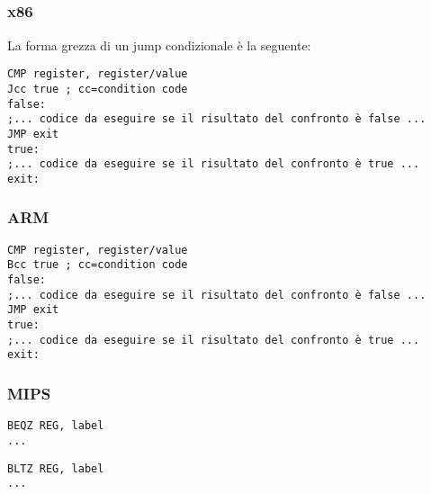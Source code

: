 \label{sec:Jcc}






\subsection{\Conclusion{}}

\subsubsection{x86}

La forma grezza di un jump condizionale è la seguente:

\begin{lstlisting}[caption=x86,style=customasmx86]
CMP register, register/value
Jcc true ; cc=condition code
false:
;... codice da eseguire se il risultato del confronto è false ...
JMP exit 
true:
;... codice da eseguire se il risultato del confronto è true ...
exit:
\end{lstlisting}

\subsubsection{ARM}

\begin{lstlisting}[caption=ARM,style=customasmARM]
CMP register, register/value
Bcc true ; cc=condition code
false:
;... codice da eseguire se il risultato del confronto è false ...
JMP exit 
true:
;... codice da eseguire se il risultato del confronto è true ...
exit:
\end{lstlisting}

\subsubsection{MIPS}

\begin{lstlisting}[caption=Check for zero,style=customasmMIPS]
BEQZ REG, label
...
\end{lstlisting}

\begin{lstlisting}[caption=Check for less than zero (using pseudoinstruction),style=customasmMIPS]
BLTZ REG, label
...
\end{lstlisting}

